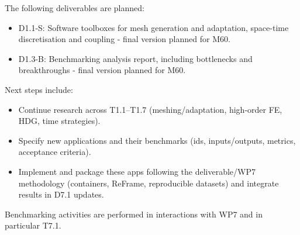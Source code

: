The following deliverables are planned:
\begin{itemize}
    \item D1.1-S: Software toolboxes for mesh generation and adaptation, space-time discretisation and coupling - final version planned for M60.
    \item D1.3-B: Benchmarking analysis report, including bottlenecks and breakthroughs - final version planned for M60.
\end{itemize}
Next steps include:
\begin{itemize}
    \item Continue research across T1.1--T1.7 (meshing/adaptation, high-order FE, HDG, time strategies).
    \item Specify new applications and their benchmarks (ids, inputs/outputs, metrics, acceptance criteria).
    \item Implement and package these apps following the deliverable/WP7 methodology (containers, ReFrame, reproducible datasets) and integrate results in D7.1 updates.
\end{itemize}
Benchmarking activities are performed in interactions with WP7 and in particular T7.1.

